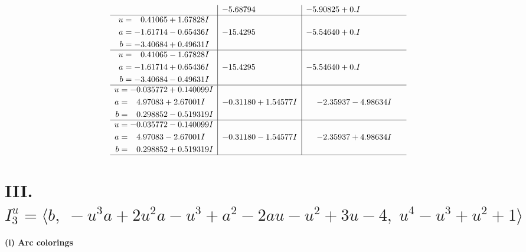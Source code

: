 \documentclass[1p]{elsarticle_modified}
\theoremstyle{definition}
\begin{document}
$$\begin{array}{c|c|c}
 & -5.68794\phantom{ +0.000000I} & -5.90825 + 0. I\phantom{ +0.000000I} \\ \hline\begin{aligned}
u &= \phantom{-}0.41065 + 1.67828 I \\
a &= -1.61714 - 0.65436 I \\
b &= -3.40684 + 0.49631 I\end{aligned}
 & -15.4295\phantom{ +0.000000I} & -5.54640 + 0. I\phantom{ +0.000000I} \\ \hline\begin{aligned}
u &= \phantom{-}0.41065 - 1.67828 I \\
a &= -1.61714 + 0.65436 I \\
b &= -3.40684 - 0.49631 I\end{aligned}
 & -15.4295\phantom{ +0.000000I} & -5.54640 + 0. I\phantom{ +0.000000I} \\ \hline\begin{aligned}
u &= -0.035772 + 0.140099 I \\
a &= \phantom{-}4.97083 + 2.67001 I \\
b &= \phantom{-}0.298852 - 0.519319 I\end{aligned}
 & -0.31180 + 1.54577 I & -2.35937 - 4.98634 I \\ \hline\begin{aligned}
u &= -0.035772 - 0.140099 I \\
a &= \phantom{-}4.97083 - 2.67001 I \\
b &= \phantom{-}0.298852 + 0.519319 I\end{aligned}
 & -0.31180 - 1.54577 I & -2.35937 + 4.98634 I\\
 \hline 
 \end{array}$$\newpage\newpage\renewcommand{\arraystretch}{1}
\centering \section*{III. $I^u_{3}= \langle b,\;- u^3 a+2 u^2 a- u^3+a^2-2 a u- u^2+3 u-4,\;u^4- u^3+u^2+1 \rangle$}
\flushleft \textbf{(i) Arc colorings}\\
\end{document}
